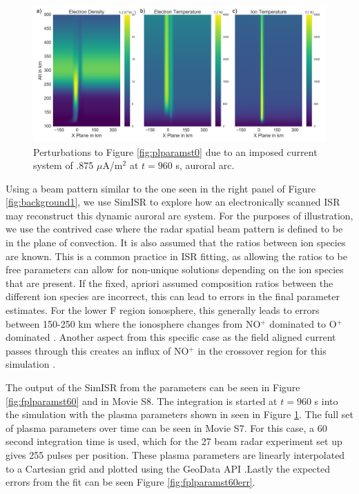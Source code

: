 \documentclass[draft,ras]{agutex}
\begin{document}
\begin{article}
\begin{figure}[!t]
\centering
\includegraphics[width=6in]{0960_15_int}
\caption{Perturbations to Figure \ref{fig:plparamst0} due to an imposed current system of .875 $\mu$A/m$^2$ at $t=960$ s, auroral arc.}
\label{fig:plparamst60}
\end{figure}

Using a beam pattern similar to the one seen in the right panel of Figure \ref{fig:background1}, we use SimISR to explore how an electronically scanned ISR may reconstruct this dynamic auroral arc system.  For the purposes of illustration, we use the contrived case where the radar spatial beam pattern is defined to be in the plane of convection.  It is also assumed that the ratios between ion species are known. This is a common practice in ISR fitting, as allowing the ratios to be free parameters can allow for non-unique solutions depending on the ion species that are present. If the fixed, apriori assumed composition ratios between the different ion species are incorrect, this can lead to errors in the final parameter estimates. For the lower F region ionosphere, this generally leads to errors between 150-250 km where the ionosphere changes from NO$^+$ dominated to O$^+$ dominated \citep{Zettergren:2011ej, Blelly:2010gf}. Another aspect from this specific case as the field aligned current passes through this creates an influx of  NO$^+$ in the crossover region for this simulation \citet{Perry:2015jf}.

The output of the SimISR from the parameters can be seen in Figure \ref{fig:fplparamst60} and in Movie S8. The integration is started at $t=960$ s into the simulation with the plasma parameters shown in seen in Figure \ref{fig:plparamst60}. The full set of plasma parameters over time can be seen in Movie S7. For this case, a 60 second integration time is used, which for the 27 beam radar experiment set up gives 255 pulses per position. These plasma parameters are linearly interpolated to a Cartesian grid and plotted using the GeoData API \cite{john_swoboda_2016_154533}.Lastly the expected errors from the fit can be seen Figure \ref{fig:fplparamst60err}.


\end{article}
\end{document}
